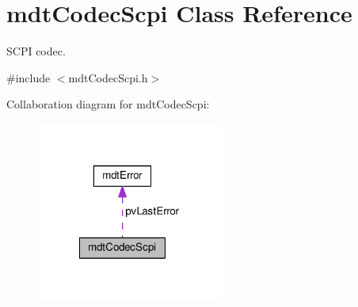 \hypertarget{classmdt_codec_scpi}{\section{mdt\-Codec\-Scpi Class Reference}
\label{classmdt_codec_scpi}
}


S\-C\-P\-I codec.  




{\ttfamily \#include $<$mdt\-Codec\-Scpi.\-h$>$}



Collaboration diagram for mdt\-Codec\-Scpi\-:
\nopagebreak
\begin{figure}[H]
\begin{center}
\leavevmode
\includegraphics[width=174pt]{classmdt_codec_scpi__coll__graph}
\end{center}
\end{figure}

